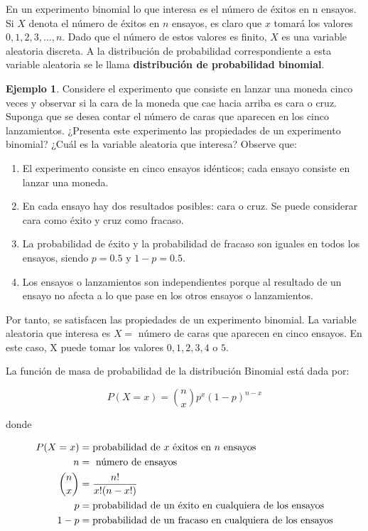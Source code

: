 \documentclass[
]{book}
\providecommand{\tightlist}{%
  \setlength{\itemsep}{0pt}\setlength{\parskip}{0pt}}
\theoremstyle{definition}
\theoremstyle{definition}
\newtheorem{example}{Ejemplo}[chapter]
\theoremstyle{definition}
\theoremstyle{definition}
\theoremstyle{remark}
\begin{document}
En un experimento binomial lo que interesa es el número de éxitos en n ensayos. Si \(X\) denota el número de éxitos en \(n\) ensayos, es claro que \(x\) tomará los valores \(0, 1, 2, 3, \ldots, n\). Dado que el número de estos valores es finito, \(X\) es una variable aleatoria discreta. A la distribución de probabilidad correspondiente a esta variable aleatoria se le llama \textbf{distribución de probabilidad binomial}.

\begin{example}
Considere el experimento que consiste en lanzar una moneda cinco veces y observar si la cara de la moneda que cae hacia arriba es cara o cruz. Suponga que se desea contar el número de caras que aparecen en los cinco lanzamientos. ¿Presenta este experimento las propiedades de un experimento binomial? ¿Cuál es la variable aleatoria que interesa? Observe que:

\begin{enumerate}
\def\labelenumi{\arabic{enumi}.}
\tightlist
\item
  El experimento consiste en cinco ensayos idénticos; cada ensayo consiste en lanzar una moneda.
\item
  En cada ensayo hay dos resultados posibles: cara o cruz. Se puede considerar cara como éxito y cruz como fracaso.
\item
  La probabilidad de éxito y la probabilidad de fracaso son iguales en todos los ensayos, siendo \(p = 0.5\) y \(1 - p = 0.5\).
\item
  Los ensayos o lanzamientos son independientes porque al resultado de un ensayo no afecta a lo que pase en los otros ensayos o lanzamientos.
\end{enumerate}

Por tanto, se satisfacen las propiedades de un experimento binomial. La variable aleatoria que interesa es \(X =\) número de caras que aparecen en cinco ensayos. En este caso, X puede tomar los valores \(0, 1, 2, 3, 4\) o \(5\).
\end{example}

La función de masa de probabilidad de la distribución Binomial está dada por:

\begin{equation}
P(X = x) = \binom{n}{x}p^x(1-p)^{n-x}
\label{eq:binomial}
\end{equation}

donde

\begin{equation}
\notag
\begin{split}
P(X = x) &= \text{probabilidad de } x \text{ éxitos en } n \text{ ensayos}\\
n &= \text{ número de ensayos}\\
\binom{n}{x} &= \dfrac{n!}{x!(n-x!)}\\
p &= \text{probabilidad de un éxito en cualquiera de los ensayos}\\
1 - p &= \text{probabilidad de un fracaso en cualquiera de los ensayos}\\
\end{split}
\end{equation}
\end{document}
